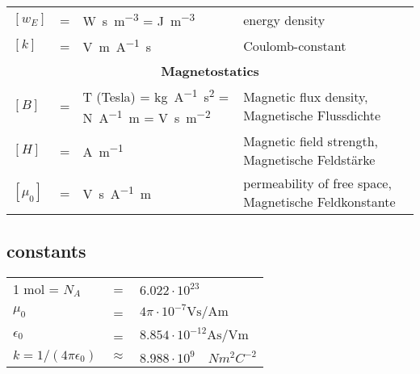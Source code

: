 {\begin{tabularx}{\linewidth}{lclX}
		$[w_E]$ &=& \si{\watt\second\per\meter\cubed} = \si{\joule\per\meter\cubed} & energy density\\
		$[k]$ &=& \si{\volt\meter\per\ampere\second} & Coulomb-constant \\				
		\multicolumn{4}{c}{\textbf{Magnetostatics}}\\
	
		$[B]$ &=& \si{\tesla} (Tesla) = \si{\kilogram\per\ampere\square\second} = \si{\newton\per\ampere\meter} = \si{\volt\second\per\square\meter} & Magnetic flux density, Magnetische Flussdichte \\
		$[H]$ &=& \si{\ampere\per\meter} & Magnetic field strength, Magnetische Feldstärke \\
		

		$[\mu_0]$ &=& \si{\volt\second\per\ampere\meter} & permeability of free space, Magnetische Feldkonstante \\

	\end{tabularx}

	\subsection{constants}
	\begin{tabularx}{\linewidth}{lcX}
		1 \si{\mol} = $N_A$  &=& $6.022\cdot 10^{23}$\\
		$\mu_0$ &=& $4\pi\cdot10^{-7} \si{\volt\second\per\ampere\meter}$\\
		$\epsilon_0$ &=& $8.854\cdot10^{-12} \si{\ampere\second\per\volt\meter}$\\
		$k = 1/(4\pi\epsilon_0)$ &$\approx$& $8.988\cdot 10^9 \quad Nm^2C^{-2}$ \\
	\end{tabularx}
	
}%